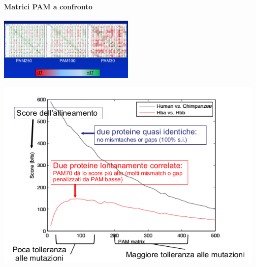 \documentclass{article}
\begin{document}
\paragraph{Matrici PAM a confronto}
\begin{center}
    \includegraphics[width=0.5\textwidth]{figures/pamconf.png}
\end{center}
\newpage
\begin{center}
    \includegraphics[width=1.25\textwidth]{figures/prot.png}
\end{center}
\newpage
\end{document}

